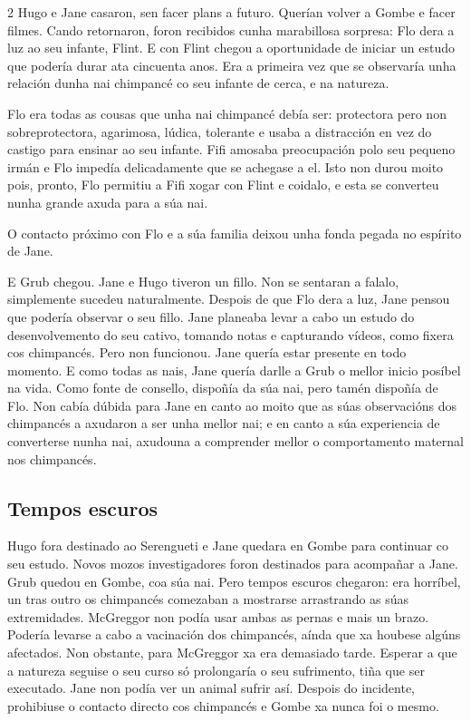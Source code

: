 \begin{multicols}{2}
Hugo e Jane casaron, sen facer plans a futuro. Querían volver a Gombe e facer
filmes. Cando retornaron, foron recibidos cunha marabillosa sorpresa: Flo dera
a luz ao seu infante, Flint. E con Flint chegou a oportunidade de iniciar un
estudo que podería durar ata cincuenta anos. Era a primeira vez que se
observaría unha relación dunha nai chimpancé co seu infante de cerca, e na
natureza.

Flo era todas as cousas que unha nai chimpancé debía ser: protectora pero non
sobreprotectora, agarimosa, lúdica, tolerante e usaba a distracción en vez do
castigo para ensinar ao seu infante. Fifi amosaba preocupación polo seu pequeno
irmán e Flo impedía delicadamente que se achegase a el. Isto non durou moito
pois, pronto, Flo permitiu a Fifi xogar con Flint e coidalo, e esta se
converteu nunha grande axuda para a súa nai.

O contacto próximo con Flo e a súa familia deixou unha fonda pegada no espírito
de Jane.

E Grub chegou. Jane e Hugo tiveron un fillo. Non se sentaran a falalo,
simplemente sucedeu naturalmente. Despois de que Flo dera a luz, Jane pensou
que podería observar o seu fillo. Jane planeaba levar a cabo un estudo do
desenvolvemento do seu cativo, tomando notas e capturando vídeos, como fixera
cos chimpancés. Pero non funcionou. Jane quería estar presente en todo momento.
E como todas as nais, Jane quería darlle a Grub o mellor inicio posíbel na
vida. Como fonte de consello, dispoñía da súa nai, pero tamén dispoñía de Flo.
Non cabía dúbida para Jane en canto ao moito que as súas observacións dos
chimpancés a axudaron a ser unha mellor nai; e en canto a súa experiencia de
converterse nunha nai, axudouna a comprender mellor o comportamento maternal
nos chimpancés.


\subsection*{Tempos escuros}

Hugo fora destinado ao Serengueti e Jane quedara en Gombe para continuar co seu
estudo. Novos mozos investigadores foron destinados para acompañar a Jane. Grub
quedou en Gombe, coa súa nai. Pero tempos escuros chegaron: era horríbel, un
tras outro os chimpancés comezaban a mostrarse arrastrando as súas
extremidades. McGreggor non podía usar ambas as pernas e mais un brazo. Podería
levarse a cabo a vacinación dos chimpancés, aínda que xa houbese algúns
afectados. Non obstante, para McGreggor xa era demasiado tarde. Esperar a que a
natureza seguise o seu curso só prolongaría o seu sufrimento, tiña que ser
executado. Jane non podía ver un animal sufrir así. Despois do incidente,
prohibiuse o contacto directo cos chimpancés e Gombe xa nunca foi o mesmo.


\end{multicols}

